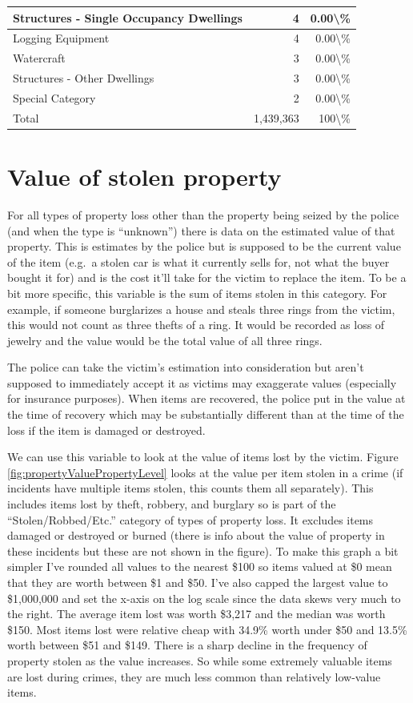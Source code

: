 \documentclass[
]{krantz}
\begin{document}
\begin{longtable}[t]{l|r|r}
\hline
Structures - Single Occupancy Dwellings & 4 & 0.00\textbackslash{}\%\\
\hline
Logging Equipment & 4 & 0.00\textbackslash{}\%\\
\hline
Watercraft & 3 & 0.00\textbackslash{}\%\\
\hline
Structures - Other Dwellings & 3 & 0.00\textbackslash{}\%\\
\hline
Special Category & 2 & 0.00\textbackslash{}\%\\
\hline
Total & 1,439,363 & 100\textbackslash{}\%\\
\hline
\end{longtable}

\section{Value of stolen
property}\label{value-of-stolen-property}

For all types of property loss other than the property being
seized by the police (and when the type is ``unknown'')
there is data on the estimated value of that property. This
is estimates by the police but is supposed to be the current
value of the item (e.g.~a stolen car is what it currently
sells for, not what the buyer bought it for) and is the cost
it'll take for the victim to replace the item. To be a bit
more specific, this variable is the sum of items stolen in
this category. For example, if someone burglarizes a house
and steals three rings from the victim, this would not count
as three thefts of a ring. It would be recorded as loss of
jewelry and the value would be the total value of all three
rings.

The police can take the victim's estimation into
consideration but aren't supposed to immediately accept it
as victims may exaggerate values (especially for insurance
purposes). When items are recovered, the police put in the
value at the time of recovery which may be substantially
different than at the time of the loss if the item is
damaged or destroyed.

We can use this variable to look at the value of items lost
by the victim. Figure \ref{fig:propertyValuePropertyLevel}
looks at the value per item stolen in a crime (if incidents
have multiple items stolen, this counts them all
separately). This includes items lost by theft, robbery, and
burglary so is part of the ``Stolen/Robbed/Etc.'' category
of types of property loss. It excludes items damaged or
destroyed or burned (there is info about the value of
property in these incidents but these are not shown in the
figure). To make this graph a bit simpler I've rounded all
values to the nearest \$100 so items valued at \$0 mean that
they are worth between \$1 and \$50. I've also capped the
largest value to \$1,000,000 and set the x-axis on the log
scale since the data skews very much to the right. The
average item lost was worth \$3,217 and the median was worth
\$150. Most items lost were relative cheap with 34.9\% worth
under \$50 and 13.5\% worth between \$51 and \$149. There is
a sharp decline in the frequency of property stolen as the
value increases. So while some extremely valuable items are
lost during crimes, they are much less common than
relatively low-value items.
\end{document}
